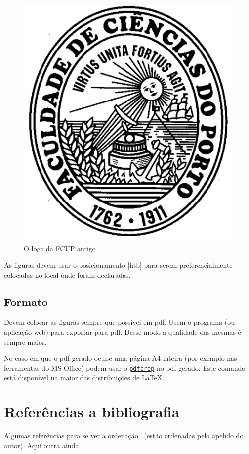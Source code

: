 \begin{figure}[htb]
   \centering %
   \includegraphics[scale=.4]{pics/fc_logo}
   \caption[FCUP logo velho]{O logo da FCUP antigo}\label{fig:logoFCUP}
\end{figure}

As figuras devem usar o posicionamento [htb] para serem preferencialmente colocadas no local onde foram declaradas.

\subsection{Formato}
    Devem colocar as figuras sempre que possível em pdf. Usem o programa (ou aplicação web) para exportar para pdf. Desse modo a qualidade das mesmas é sempre maior.

    No caso em que o pdf gerado ocupe uma página A4 inteira (por exemplo nas ferramentas do MS Office) podem usar o \texttt{\href{https://www.ctan.org/pkg/pdfcrop?lang=en}{pdfcrop}} no pdf gerado. Este comando está disponível na maior das distribuições de \LaTeX.


\section{Referências a bibliografia}
Algumas referências para se ver a ordenação~\cite{yaacoub2012} (estão ordenadas pelo apelido do autor). Aqui outra ainda~\cite{etsitr102732}.

